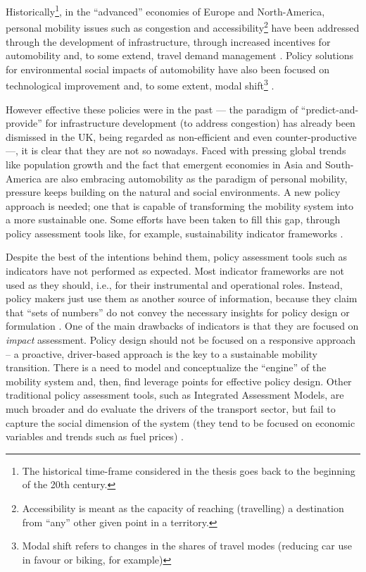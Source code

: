 Historically\footnote{The historical time-frame considered in the thesis goes back to the beginning of the 20th century.}, in the ``advanced'' economies of Europe and North-America, personal mobility issues such as congestion and accessibility\footnote{Accessibility is meant as the capacity of reaching (travelling) a destination from ``any'' other given point in a territory.} have been addressed through the development of infrastructure, through increased incentives for automobility and, to some extend, travel demand management \parencite{lyons2012_VisionsFutureNeed}. Policy solutions for environmental social impacts of automobility have also been focused on technological improvement and, to some extent, modal shift\footnote{Modal shift refers to changes in the shares of travel modes (reducing car use in favour or biking, for example)} \parencite{koehler2009_transitionsmodelsustainable}.

However effective these policies were in the past --- the paradigm of ``predict-and-provide'' for infrastructure development (to address congestion) has already been dismissed in the UK, being regarded as non-efficient and even counter-productive \parencite{goodwin2012_ProvidingRoadCapacity} ---, it is clear that they are not so nowadays. Faced with pressing global trends like population growth and the fact that emergent economies in Asia and South-America are also embracing automobility as the paradigm of personal mobility, pressure keeps building on the natural and social environments. A new policy approach is needed; one that is capable of transforming the mobility system into a more sustainable one. Some efforts have been taken to fill this gap, through policy assessment tools like, for example, sustainability indicator frameworks \parencite{castillo2010_ELASTICmethodological,haghshenas2012_Urbansustainabletransportation,litman2007_DevelopingIndicatorsComprehensive,shiau2013_Developingindicatorsystem}.

Despite the best of the intentions behind them, policy assessment tools such as indicators have not performed as expected. Most indicator frameworks are not used as they should, i.e., for their instrumental and operational roles. Instead, policy makers just use them as another source of information, because they claim that ``sets of numbers'' do not convey the necessary insights for policy design or formulation \parencite{gudmundsson2013_SomeuseLittleinfluence}. One of the main drawbacks of indicators is that they are focused on \emph{impact} assessment. Policy design should not be focused on a responsive approach -- a proactive, driver-based approach is the key to a sustainable mobility transition. There is a need to model and conceptualize the ``engine'' of the mobility system and, then, find leverage points for effective policy design. Other traditional policy assessment tools, such as Integrated Assessment Models, are much broader and do evaluate the drivers of the transport sector, but fail to capture the social dimension of the system (they tend to be focused on economic variables and trends such as fuel prices) \parencite{creutzig2015_EvolvingNarrativesLow}.

